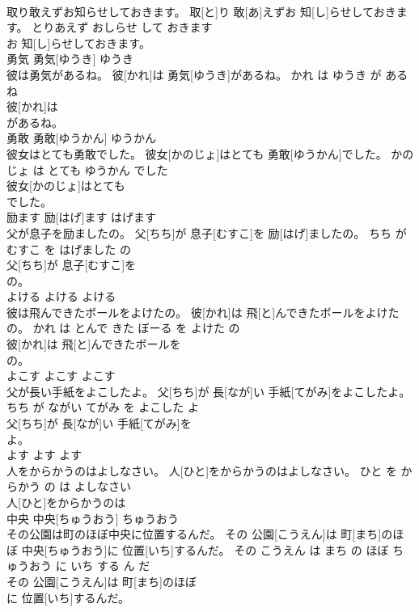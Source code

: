 \documentclass[8pt]{extreport}
\begin{document}
\begin{CJK}{UTF8}{min}
\\	取り敢えずお知らせしておきます。	取[と]り 敢[あ]えずお 知[し]らせしておきます。	とりあえず おしらせ して おきます	
\\	お 知[し]らせしておきます。			
\\	勇気	勇気[ゆうき]	ゆうき	
\\	彼は勇気があるね。	彼[かれ]は 勇気[ゆうき]があるね。	かれ は ゆうき が ある ね	
\\	彼[かれ]は
\\	があるね。			
\\	勇敢	勇敢[ゆうかん]	ゆうかん	
\\	彼女はとても勇敢でした。	彼女[かのじょ]はとても 勇敢[ゆうかん]でした。	かのじょ は とても ゆうかん でした	
\\	彼女[かのじょ]はとても
\\	でした。			
\\	励ます	励[はげ]ます	はげます	
\\	父が息子を励ましたの。	父[ちち]が 息子[むすこ]を 励[はげ]ましたの。	ちち が むすこ を はげました の	
\\	父[ちち]が 息子[むすこ]を
\\	の。			
\\	よける	よける	よける	
\\	彼は飛んできたボールをよけたの。	彼[かれ]は 飛[と]んできたボールをよけたの。	かれ は とんで きた ぼーる を よけた の	
\\	彼[かれ]は 飛[と]んできたボールを
\\	の。			
\\	よこす	よこす	よこす	
\\	父が長い手紙をよこしたよ。	父[ちち]が 長[なが]い 手紙[てがみ]をよこしたよ。	ちち が ながい てがみ を よこした よ	
\\	父[ちち]が 長[なが]い 手紙[てがみ]を
\\	よ。			
\\	よす	よす	よす	
\\	人をからかうのはよしなさい。	人[ひと]をからかうのはよしなさい。	ひと を からかう の は よしなさい	
\\	人[ひと]をからかうのは
\\	中央	中央[ちゅうおう]	ちゅうおう	
\\	その公園は町のほぼ中央に位置するんだ。	その 公園[こうえん]は 町[まち]のほぼ 中央[ちゅうおう]に 位置[いち]するんだ。	その こうえん は まち の ほぼ ちゅうおう に いち する ん だ	
\\	その 公園[こうえん]は 町[まち]のほぼ
\\	に 位置[いち]するんだ。			

\end{CJK}
\end{document}
